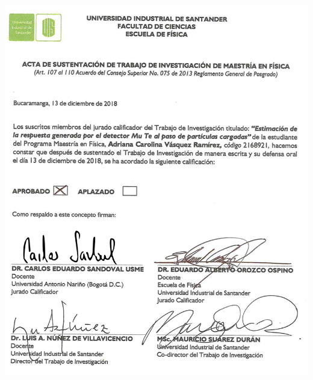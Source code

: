 \documentclass[12pt,oneside,openany,letter]{book}
\begin{document}
\includegraphics[scale=1]{ACTA.png}
\newpage
\end{document}
